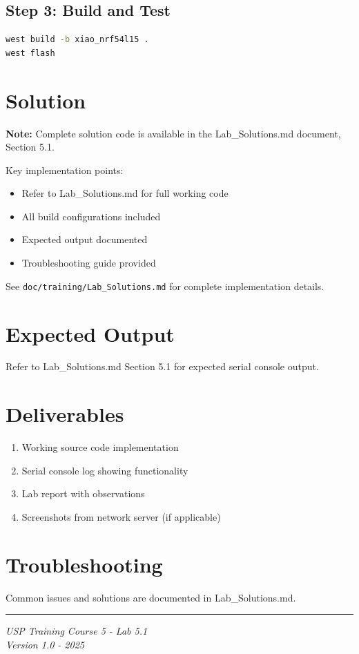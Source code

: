 \documentclass[11pt,a4paper]{article}
\begin{document}
\subsection{Step 3: Build and Test}
\begin{lstlisting}[language=bash]
west build -b xiao_nrf54l15 .
west flash
\end{lstlisting}

\section{Solution}

\begin{solutionbox}
\textbf{Note:} Complete solution code is available in the Lab\_Solutions.md document, Section 5.1.

Key implementation points:
\begin{itemize}
    \item Refer to Lab\_Solutions.md for full working code
    \item All build configurations included
    \item Expected output documented
    \item Troubleshooting guide provided
\end{itemize}

See \texttt{doc/training/Lab\_Solutions.md} for complete implementation details.
\end{solutionbox}

\section{Expected Output}

Refer to Lab\_Solutions.md Section 5.1 for expected serial console output.

\section{Deliverables}

\begin{enumerate}[itemsep=10pt]
    \item Working source code implementation
    \item Serial console log showing functionality
    \item Lab report with observations
    \item Screenshots from network server (if applicable)
\end{enumerate}

\section{Troubleshooting}

Common issues and solutions are documented in Lab\_Solutions.md.

\vfill
\noindent\rule{\textwidth}{0.4pt}
\begin{center}
\textit{USP Training Course 5 - Lab 5.1}\\
\textit{Version 1.0 - 2025}
\end{center}
\end{document}
